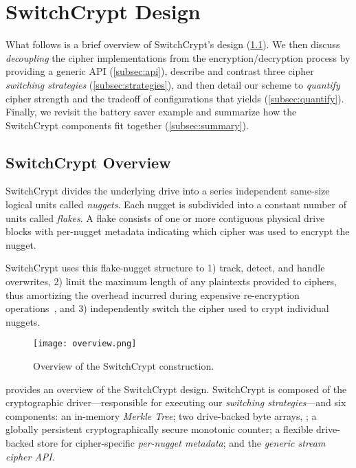 \section{SwitchCrypt Design} \label{sec:design}

What follows is a brief overview of SwitchCrypt's design
(\cref{subsec:overview}). We then discuss \emph{decoupling} the cipher
implementations from the encryption/decryption process by providing a generic
API (\cref{subsec:api}), describe and contrast three cipher \emph{switching
strategies} (\cref{subsec:strategies}), and then detail our scheme to
\emph{quantify} cipher strength and the tradeoff of configurations that yields
(\cref{subsec:quantify}). Finally, we revisit the battery saver example and
summarize how the SwitchCrypt components fit together (\cref{subsec:summary}).

\subsection{SwitchCrypt Overview}\label{subsec:overview}

SwitchCrypt divides the underlying drive into a series independent same-size
logical units called \emph{nuggets}. Each nugget is subdivided into a constant
number of units called \emph{flakes}. A flake consists of one or more contiguous
physical drive  blocks with per-nugget metadata indicating which cipher was used
to encrypt the nugget.

SwitchCrypt uses this flake-nugget structure to 1) track, detect, and handle
overwrites, 2) limit the maximum length of any plaintexts provided to ciphers,
thus amortizing the overhead incurred during expensive re-encryption
operations~\cite{StrongBox}, and 3) independently switch the cipher used to
crypt individual nuggets.


\begin{figure}[ht]
   \centering
   \texttt{[image: overview.png]}
   \caption{Overview of the SwitchCrypt construction.}\label{fig:overview}
\end{figure}

 provides an overview of the SwitchCrypt design. SwitchCrypt is
composed of the cryptographic driver---responsible for executing our
\emph{switching strategies}---and six components: an in-memory \emph{Merkle
Tree}; two drive-backed byte arrays, ; a globally persistent cryptographically secure
monotonic counter; a flexible drive-backed store for cipher-specific
\emph{per-nugget metadata}; and the \emph{generic stream cipher API}.


